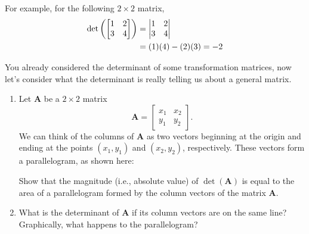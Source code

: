 For example, for the following $2\times 2$ matrix,
\begin{align}
\mbox{det}\left(\begin{bmatrix} 1 & 2 \\ 3 & 4\end{bmatrix}\right) &= \begin{vmatrix} 1 & 2\\ 3 & 4 \end{vmatrix} \nonumber \\
&=  (1)(4)-(2)(3) =  -2
\end{align}

You already considered the determinant of some transformation matrices, now let's consider what the determinant is really telling us about a general matrix.

\begin{prob}
\begin{enumerate}
\item Let $\mathbf{A}$ be a $2\times 2$ matrix
$$\mathbf{A} = \begin{bmatrix} x_1 & x_2 \\ y_1 & y_2 \end{bmatrix}.$$
We can think of the columns of $\mathbf{A}$ as two vectors beginning at the origin and ending at the points $(x_1,y_1)$ and $(x_2,y_2)$, respectively. These vectors form a parallelogram, as shown here:
\begin{center}
\end{center}

Show that the magnitude (i.e., absolute value) of $\det(\mathbf{A})$ is equal to the area of a parallelogram formed by the column vectors of the matrix $\mathbf{A}$.
\item What is the determinant of $\mathbf{A}$ if its column vectors are on the same line? Graphically, what happens to the parallelogram?
\end{enumerate}
\end{prob}
